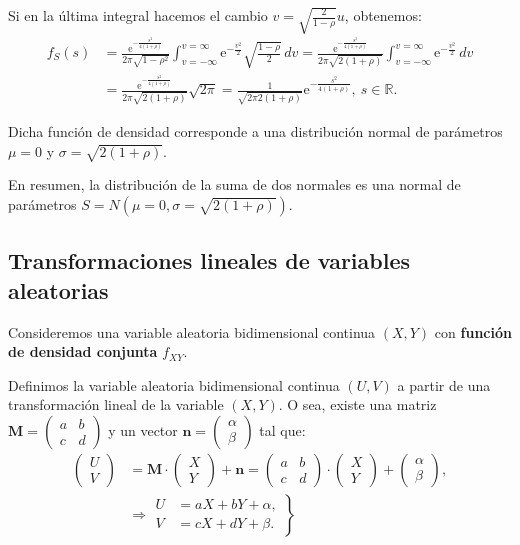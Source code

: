 \documentclass[]{book}
\begin{document}
Si en la última integral hacemos el cambio \(v=\sqrt{\frac{2}{1-\rho}}u\), obtenemos:
\[
\begin{array}{rl}
f_S(s)  & = \frac{\mathrm{e}^{-\frac{s^2}{4(1+\rho)}}}{2\pi\sqrt{1-\rho^2}}\int_{v=-\infty}^{v=\infty}\mathrm{e}^{-\frac{v^2}{2}} \sqrt{\frac{1-\rho}{2}}\, dv= \frac{\mathrm{e}^{-\frac{s^2}{4(1+\rho)}}}{2\pi\sqrt{2(1+\rho)}}\int_{v=-\infty}^{v=\infty}\mathrm{e}^{-\frac{v^2}{2}} \, dv \\ & = \frac{\mathrm{e}^{-\frac{s^2}{4(1+\rho)}}}{2\pi\sqrt{2(1+\rho)}} \sqrt{2\pi}= \frac{1}{\sqrt{2\pi 2(1+\rho)}}\mathrm{e}^{-\frac{s^2}{4(1+\rho)}},\ s\in\mathbb{R}.
\end{array}
\]

Dicha función de densidad corresponde a una distribución normal de parámetros \(\mu =0\) y \(\sigma = \sqrt{2(1+\rho)}\).

En resumen, la distribución de la suma de dos normales es una normal de parámetros \(S=N(\mu=0,\sigma = \sqrt{2(1+\rho)})\).

\hypertarget{transformaciones-lineales-de-variables-aleatorias}{%
\subsection{Transformaciones lineales de variables aleatorias}\label{transformaciones-lineales-de-variables-aleatorias}}

Consideremos una variable aleatoria bidimensional continua \((X,Y)\) con \textbf{función de densidad conjunta} \(f_{XY}\).

Definimos la variable aleatoria bidimensional continua \((U,V)\) a partir de una transformación lineal de la variable \((X,Y)\). O sea, existe una matriz \(\mathbf{M}=\begin{pmatrix}a & b\\ c& d\end{pmatrix}\) y un vector \(\mathbf{n}=\begin{pmatrix}\alpha\\\beta \end{pmatrix}\) tal que:
\[
\begin{array}{rl}
\begin{pmatrix}U\\ V\end{pmatrix} & =\mathbf{M}\cdot \begin{pmatrix}X\\ Y\end{pmatrix}+\mathbf{n}=\begin{pmatrix}a & b\\ c& d\end{pmatrix}\cdot\begin{pmatrix}X\\ Y\end{pmatrix}+\begin{pmatrix}\alpha\\\beta \end{pmatrix},\\  & \Rightarrow \left.\begin{array}{rl}U & = aX+bY+\alpha,\\ V & =cX+dY+\beta.\end{array}\right\}
\end{array}
\]
\end{document}
